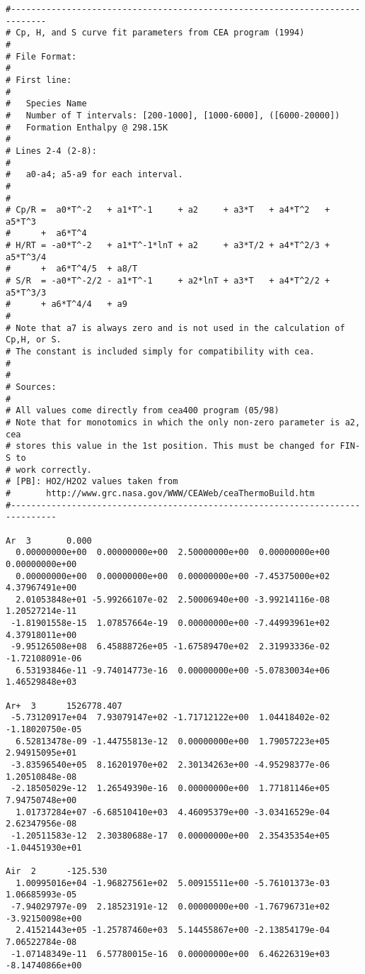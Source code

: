 \small
\linenumbers*
\begin{verbatim}
#-----------------------------------------------------------------------------
# Cp, H, and S curve fit parameters from CEA program (1994)
# 
# File Format:
# 
# First line:
# 
# 	Species Name
# 	Number of T intervals: [200-1000], [1000-6000], ([6000-20000])
# 	Formation Enthalpy @ 298.15K
# 
# Lines 2-4 (2-8):
# 
# 	a0-a4; a5-a9 for each interval.
# 
# 
# Cp/R =  a0*T^-2   + a1*T^-1     + a2     + a3*T   + a4*T^2   + a5*T^3   
#      +  a6*T^4
# H/RT = -a0*T^-2   + a1*T^-1*lnT + a2     + a3*T/2 + a4*T^2/3 + a5*T^3/4 
#      +  a6*T^4/5  + a8/T
# S/R  = -a0*T^-2/2 - a1*T^-1     + a2*lnT + a3*T   + a4*T^2/2 + a5*T^3/3 
#      + a6*T^4/4   + a9
# 
# Note that a7 is always zero and is not used in the calculation of Cp,H, or S.
# The constant is included simply for compatibility with cea.
# 
# 
# Sources:
# 
# All values come directly from cea400 program (05/98)
# Note that for monotomics in which the only non-zero parameter is a2, cea 
# stores this value in the 1st position. This must be changed for FIN-S to 
# work correctly.
# [PB]: HO2/H2O2 values taken from  
#       http://www.grc.nasa.gov/WWW/CEAWeb/ceaThermoBuild.htm 
#-------------------------------------------------------------------------------

Ar  3		0.000                                                            
  0.00000000e+00  0.00000000e+00  2.50000000e+00  0.00000000e+00  0.00000000e+00
  0.00000000e+00  0.00000000e+00  0.00000000e+00 -7.45375000e+02  4.37967491e+00
  2.01053848e+01 -5.99266107e-02  2.50006940e+00 -3.99214116e-08  1.20527214e-11
 -1.81901558e-15  1.07857664e-19  0.00000000e+00 -7.44993961e+02  4.37918011e+00
 -9.95126508e+08  6.45888726e+05 -1.67589470e+02  2.31993336e-02 -1.72108091e-06
  6.53193846e-11 -9.74014773e-16  0.00000000e+00 -5.07830034e+06  1.46529848e+03
										 
Ar+  3		1526778.407					 	         
 -5.73120917e+04  7.93079147e+02 -1.71712122e+00  1.04418402e-02 -1.18020750e-05
  6.52813478e-09 -1.44755813e-12  0.00000000e+00  1.79057223e+05  2.94915095e+01
 -3.83596540e+05  8.16201970e+02  2.30134263e+00 -4.95298377e-06  1.20510848e-08
 -2.18505029e-12  1.26549390e-16  0.00000000e+00  1.77181146e+05  7.94750748e+00
  1.01737284e+07 -6.68510410e+03  4.46095379e+00 -3.03416529e-04  2.62347956e-08
 -1.20511583e-12  2.30380688e-17  0.00000000e+00  2.35435354e+05 -1.04451930e+01
										 
Air  2		-125.530						         
  1.00995016e+04 -1.96827561e+02  5.00915511e+00 -5.76101373e-03  1.06685993e-05
 -7.94029797e-09  2.18523191e-12  0.00000000e+00 -1.76796731e+02 -3.92150098e+00
  2.41521443e+05 -1.25787460e+03  5.14455867e+00 -2.13854179e-04  7.06522784e-08
 -1.07148349e-11  6.57780015e-16  0.00000000e+00  6.46226319e+03 -8.14740866e+00
										 

\end{verbatim}
